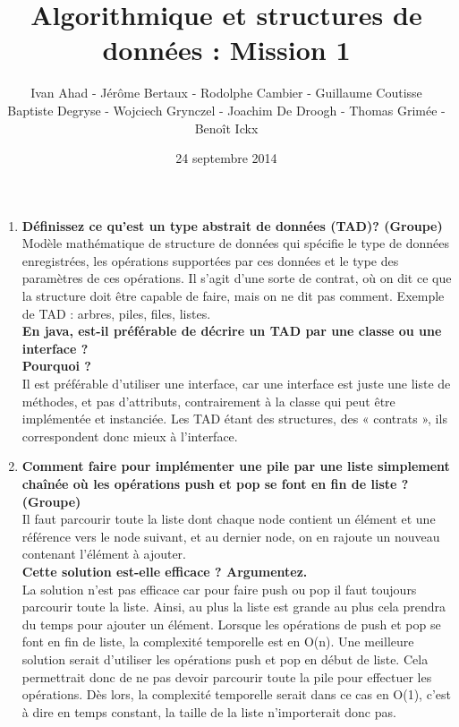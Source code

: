 \documentclass[a4paper]{article}
\title{Algorithmique et structures de données : Mission 1}
\date{24 septembre 2014}
\author{Ivan Ahad - Jérôme Bertaux - Rodolphe Cambier - Guillaume Coutisse\\ 
	Baptiste Degryse - Wojciech Grynczel - Joachim De Droogh - Thomas Grimée - Benoît Ickx}
\begin{document}
	
\maketitle

\begin{enumerate}
	\item\textbf{Définissez ce qu’est un type abstrait de données
	(TAD)? (Groupe)}\\ Modèle mathématique de structure de données qui spécifie le type de données enregistrées, les opérations supportées par ces données et le type des paramètres de ces opérations.  Il s'agit d'une sorte de contrat, où on dit ce que la structure doit être capable de faire, mais on ne dit pas comment. Exemple de TAD : arbres, piles, files, listes. \\
	
	\textbf{En java, est-il préférable
	de décrire un TAD par une classe ou une interface ?\\Pourquoi ?}\\
	Il est préférable d’utiliser une interface,  car une interface est juste une liste de méthodes, et pas d'attributs, contrairement à la classe qui peut être implémentée et instanciée. Les TAD étant des structures, des « contrats », ils correspondent donc mieux à l’interface. 
	
	\item\textbf{Comment faire pour implémenter une pile par une liste simplement chaînée où les opérations push et pop se font en fin de liste ? (Groupe)}\\
	Il faut parcourir toute la liste dont chaque node contient un élément et une référence vers le node suivant, et au dernier node, on en rajoute un nouveau contenant l’élément à ajouter. \\
	
	\textbf{Cette solution est-elle efficace ? Argumentez.}\\
	La solution n’est pas efficace car pour faire push ou pop il faut toujours parcourir toute la liste. Ainsi, au plus la liste est grande au plus cela prendra du temps pour ajouter un élément. Lorsque les opérations de push et pop se font en fin de liste, la complexité temporelle est en O(n). Une meilleure solution serait d’utiliser les opérations push et pop en début de liste. Cela permettrait donc de ne pas devoir parcourir toute la pile pour effectuer les opérations. Dès lors, la complexité temporelle serait dans ce cas en O(1), c’est à dire en temps constant, la taille de la liste n’importerait donc pas.  
	

\end{enumerate}
\end{document}
